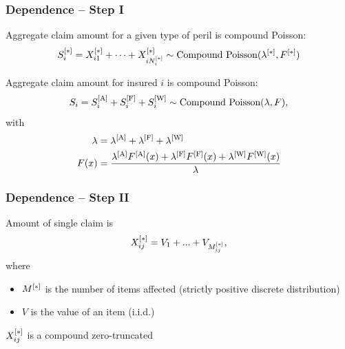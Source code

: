 \begin{frame}
  \frametitle{Dependence -- Step I}

  \begin{assumption}
    Aggregate claim amount for a given type of peril is compound Poisson:
    \begin{equation*}
      S_i^{[\ast]} = X_{i1}^{[\ast]} + \dots + X_{iN_i^{[\ast]}}^{[\ast]}
      \sim \text{Compound Poisson}(\lambda^{[\ast]}, F^{[\ast]})
    \end{equation*}
  \end{assumption}
  \pause

  \begin{consequence}
    Aggregate claim amount for insured $i$ is compound Poisson:
    \begin{equation*}
      S_i = S_i^{[\text{A}]} + S_i^{[\text{F}]} + S_i^{[\text{W}]} \sim
      \text{Compound Poisson}(\lambda, F),
    \end{equation*}
    with
    \begin{align*}
      \lambda &= \lambda^{[\text{A}]} + \lambda^{[\text{F}]} + \lambda^{[\text{W}]} \\
      F(x) &= \frac{\lambda^{[\text{A}]} F^{[\text{A}]}(x) + \lambda^{[\text{F}]} F^{[\text{F}]}(x) +
               \lambda^{[\text{W}]} F^{[\text{W}]}(x)}{\lambda}
      \end{align*}
  \end{consequence}
\end{frame}

\begin{frame}
  \frametitle{Dependence -- Step II}

  \begin{assumption}
    Amount of single claim is
    \begin{equation*}
      X_{ij}^{[\ast]} = V_1 + ... + V_{M_{ij}^{[\ast]}},
    \end{equation*}
    where
    \begin{itemize}
    \item $M^{[\ast]}$ is the number of items affected (strictly
      positive discrete distribution)
    \item $V$ is the value of an item (i.i.d.)
    \end{itemize}
  \end{assumption}
  \pause

  \begin{consequence}
    $X_{ij}^{[\ast]}$ is a compound zero-truncated
  \end{consequence}
\end{frame}

